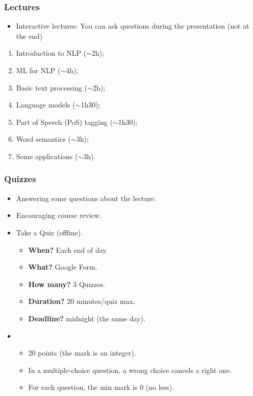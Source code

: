 \documentclass{beamer}
\begin{document}
\begin{frame}
\frametitle{Lectures}

\begin{itemize}
	\item Interactive lectures: You can ask questions during the presentation (not at the end)
\end{itemize}

\begin{enumerate}
	\item Introduction to NLP ($\sim$2h);
	\item ML for NLP ($\sim$4h);
	\item Basic text processing ($\sim$2h);
	\item Language models ($\sim$1h30);
	\item Part of Speech (PoS) tagging ($\sim$1h30);
	\item Word semantics ($\sim$3h);
	\item Some applications ($\sim$3h).
\end{enumerate}

\end{frame}

\begin{frame}
	\frametitle{Quizzes}
	
	\begin{itemize}
		\item Answering some questions about the lecture.
		\item {} Encouraging course review.
		\item {} Take a Quiz (offline).
		\begin{itemize}
			\item \textbf{When?} Each end of day.
			\item \textbf{What?} Google Form.
			\item \textbf{How many?} 3 Quizzes.
			\item \textbf{Duration?} 20 minutes/quiz max.
			\item \textbf{Deadline?} midnight (the same day).
		\end{itemize}
		\item {}
		\begin{itemize}
			\item 20 points (the mark is an integer).
			\item In a multiple-choice question, a wrong choice cancels a right one.
			\item For each question, the min mark is 0 (no less).
		\end{itemize}
	\end{itemize}
	
\end{frame}
\end{document}
